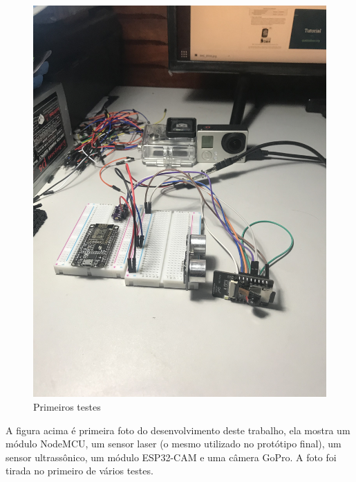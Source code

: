 \documentclass[
	12pt,				%
	openright,			%
	oneside,			%
	a4paper,			%
	chapter=TITLE,		%
	english,			%
	brazil				%
	]{abntex2}
\begin{document}
\begin{figure}[H]
    \centering
    \includegraphics[scale=0.09, angle=-90]{imagens/IMG_8989.jpg}
    \caption{Primeiros testes}
        \label{fig:aprincipio}
    \end{figure}

A figura acima é primeira foto do desenvolvimento deste trabalho, ela mostra um módulo NodeMCU, um sensor laser (o mesmo utilizado no protótipo final), 
um sensor ultrassônico, um módulo ESP32-CAM e uma câmera GoPro. A foto foi tirada no primeiro de vários testes. 
\end{document}
